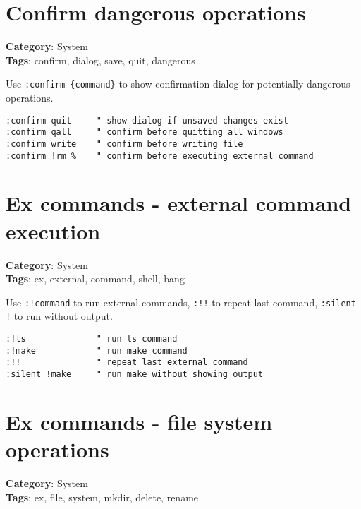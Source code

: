 {{{{{{{{{{{{{\section{Confirm dangerous operations}

\textbf{Category}: System\\ \textbf{Tags}: confirm, dialog, save, quit, dangerous
\vspace{0.5cm}

Use {\footnotesize \Verb§:confirm {command}§} to show confirmation dialog for potentially dangerous operations.

\begin{Exa*}{}
\begin{Verbatim}[fontsize=\footnotesize, breaklines, breakanywhere]
:confirm quit     " show dialog if unsaved changes exist
:confirm qall     " confirm before quitting all windows
:confirm write    " confirm before writing file
:confirm !rm %    " confirm before executing external command
\end{Verbatim}
\end{Exa*}

\section{Ex commands - external command execution}

\textbf{Category}: System\\ \textbf{Tags}: ex, external, command, shell, bang
\vspace{0.5cm}

Use {\footnotesize \Verb§:!command§} to run external commands, {\footnotesize \Verb§:!!§} to repeat last command, {\footnotesize \Verb§:silent !§} to run without output.

\begin{Exa*}{}
\begin{Verbatim}[fontsize=\footnotesize, breaklines, breakanywhere]
:!ls              " run ls command
:!make            " run make command
:!!               " repeat last external command
:silent !make     " run make without showing output
\end{Verbatim}
\end{Exa*}

\section{Ex commands - file system operations}

\textbf{Category}: System\\ \textbf{Tags}: ex, file, system, mkdir, delete, rename
\vspace{0.5cm}

}}}}}}}}}}}}}
